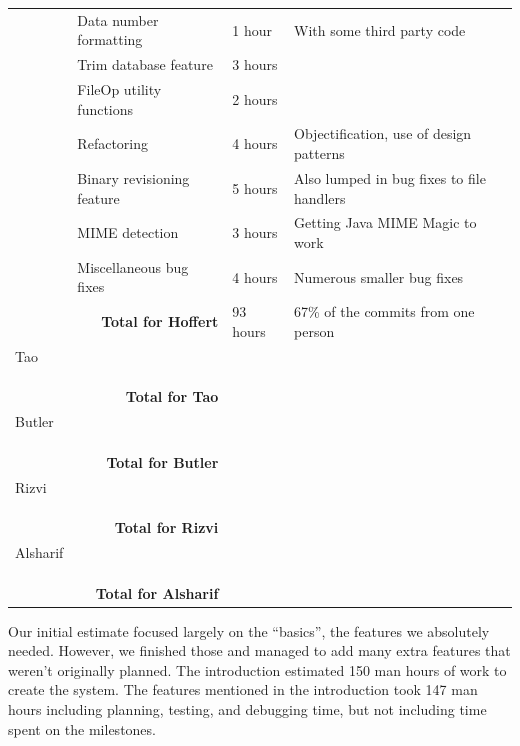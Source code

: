\documentclass[12pt,a4paper]{article}
\begin{document}
\begin{longtable}{| p{2cm} | p{5cm} | p{3cm}| p{4.5cm} |}
   & Data number formatting & 1 hour & With some third party code\\ \cline{2-4}
   & Trim database feature & 3 hours & \\ \cline{2-4}
   & FileOp utility functions & 2 hours & \\ \cline{2-4}
   & Refactoring & 4 hours & Objectification, use of design patterns \\ \cline{2-4}
   & Binary revisioning feature & 5 hours & Also lumped in bug fixes to file handlers \\ \cline{2-4}
   & MIME detection & 3 hours & Getting Java MIME Magic to work\\ \cline{2-4}
   & Miscellaneous bug fixes & 4 hours & Numerous smaller bug fixes\\ \hline
  \multicolumn{2}{|r|}{\textbf{Total for Hoffert}} & 93 hours & 67\% of the commits from one person\\ \hline \hline
  Tao &  &  & \\ \cline{2-4}
   &  &  & \\ \cline{2-4}
   &  &  & \\ \cline{2-4}
   &  &  & \\ \hline
  \multicolumn{2}{|r|}{\textbf{Total for Tao}}  &  & \\ \hline \hline
  Butler &  &  & \\ \cline{2-4}
   &  &  & \\ \cline{2-4}
   &  &  & \\ \cline{2-4}
   &  &  & \\ \hline
  \multicolumn{2}{|r|}{\textbf{Total for Butler}}  &  & \\ \hline \hline
  Rizvi &  &  & \\ \cline{2-4}
   &  &  & \\ \cline{2-4}
   &  &  & \\ \cline{2-4}
   &  &  & \\ \hline
  \multicolumn{2}{|r|}{\textbf{Total for Rizvi}}  &  & \\ \hline \hline
  Alsharif &  &  & \\ \cline{2-4}
   &  &  & \\ \cline{2-4}
   &  &  & \\ \cline{2-4}
   &  &  & \\ \hline
  \multicolumn{2}{|r|}{\textbf{Total for Alsharif}}  &  & \\ \hline
\end{longtable}

Our initial estimate focused largely on the ``basics'', the features we absolutely needed. However, we finished those and managed to add many extra features that weren't originally planned. The introduction estimated 150 man hours of work to create the system. The features mentioned in the introduction took 147 man hours including planning, testing, and debugging time, but not including time spent on the milestones.
\end{document}
